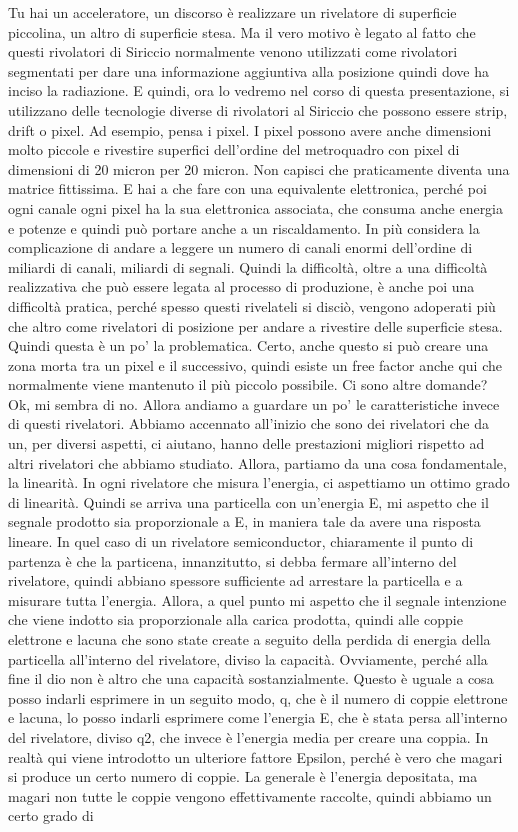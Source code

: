 {Tu hai un acceleratore, un discorso è realizzare un rivelatore di superficie piccolina, un altro di superficie stesa. Ma il vero motivo è legato al fatto che questi rivolatori di Siriccio normalmente venono utilizzati come rivolatori segmentati per dare una informazione aggiuntiva alla posizione quindi dove ha inciso la radiazione. E quindi, ora lo vedremo nel corso di questa presentazione, si utilizzano delle tecnologie diverse di rivolatori al Siriccio che possono essere strip, drift o pixel. Ad esempio, pensa i pixel. I pixel possono avere anche dimensioni molto piccole e rivestire superfici dell'ordine del metroquadro con pixel di dimensioni di 20 micron per 20 micron. Non capisci che praticamente diventa una matrice fittissima. E hai a che fare con una equivalente elettronica, perché poi ogni canale ogni pixel ha la sua elettronica associata, che consuma anche energia e potenze e quindi può portare anche a un riscaldamento. In più considera la complicazione di andare a leggere un numero di canali enormi dell'ordine di miliardi di canali, miliardi di segnali. Quindi la difficoltà, oltre a una difficoltà realizzativa che può essere legata al processo di produzione, è anche poi una difficoltà pratica, perché spesso questi rivelateli si disciò, vengono adoperati più che altro come rivelatori di posizione per andare a rivestire delle superficie stesa. Quindi questa è un po' la problematica. Certo, anche questo si può creare una zona morta tra un pixel e il successivo, quindi esiste un free factor anche qui che normalmente viene mantenuto il più piccolo possibile. Ci sono altre domande? Ok, mi sembra di no. Allora andiamo a guardare un po' le caratteristiche invece di questi rivelatori. Abbiamo accennato all'inizio che sono dei rivelatori che da un, per diversi aspetti, ci aiutano, hanno delle prestazioni migliori rispetto ad altri rivelatori che abbiamo studiato. Allora, partiamo da una cosa fondamentale, la linearità. In ogni rivelatore che misura l'energia, ci aspettiamo un ottimo grado di linearità. Quindi se arriva una particella con un'energia E, mi aspetto che il segnale prodotto sia proporzionale a E, in maniera tale da avere una risposta lineare. In quel caso di un rivelatore semiconductor, chiaramente il punto di partenza è che la particena, innanzitutto, si debba fermare all'interno del rivelatore, quindi abbiano spessore sufficiente ad arrestare la particella e a misurare tutta l'energia. Allora, a quel punto mi aspetto che il segnale intenzione che viene indotto sia proporzionale alla carica prodotta, quindi alle coppie elettrone e lacuna che sono state create a seguito della perdida di energia della particella all'interno del rivelatore, diviso la capacità. Ovviamente, perché alla fine il dio non è altro che una capacità sostanzialmente. Questo è uguale a cosa posso indarli esprimere in un seguito modo, q, che è il numero di coppie elettrone e lacuna, lo posso indarli esprimere come l'energia E, che è stata persa all'interno del rivelatore, diviso q2, che invece è l'energia media per creare una coppia. In realtà qui viene introdotto un ulteriore fattore Epsilon, perché è vero che magari si produce un certo numero di coppie. La generale è l'energia depositata, ma magari non tutte le coppie vengono effettivamente raccolte, quindi abbiamo un certo grado di }
